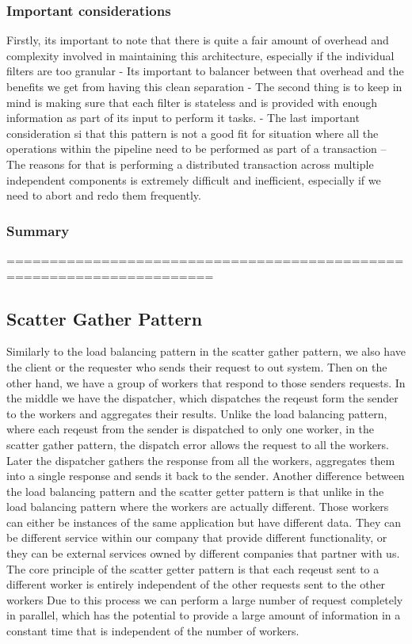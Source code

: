 \documentclass[a4paper, 11pt]{book}
\begin{document}
    \subsubsection{Important considerations}
    Firstly, its important to note that there is quite a fair amount of overhead and complexity involved in maintaining this architecture, especially if the individual filters are too granular
    - Its important to balancer between that overhead and the benefits we get from having this clean separation
    - The second thing is to keep in mind is making sure that each filter is stateless and is provided with enough information as part of its input to perform it tasks.
    - The last important consideration si that this pattern is not a good fit for situation where all the operations within the pipeline need to be performed as part of a transaction
    -- The reasons for that is performing a distributed transaction across multiple independent components is extremely difficult and inefficient, especially if we need to abort and redo them frequently.

    \subsubsection{Summary}
    ======================================================================

    \subsection{Scatter Gather Pattern}

    Similarly to the load balancing pattern in the scatter gather pattern, we also have the client or the requester who sends their request to out system.
    Then on the other hand, we have a group of workers that respond to those senders requests.
    In the middle we have the dispatcher, which dispatches the reqeust form the sender to the workers and aggregates their results.
    Unlike the load balancing pattern, where each reqeust from the sender is dispatched to only one worker, in the scatter gather pattern, the dispatch error allows the request to all the workers.
    Later the dispatcher gathers the response from all the workers, aggregates them into a single response and sends it back to the sender.
    Another difference between the load balancing pattern and the scatter getter pattern is that unlike in the load balancing pattern where the workers are actually different.
    Those workers can either be instances of the same application but have different data.
    They can be different service within our company that provide different functionality, or they can be external services owned by different companies that partner with us.
    The core principle of the scatter getter pattern is that each reqeust sent to a different worker is entirely independent of the other requests sent to the other workers
    Due to this process we can perform a large number of request completely in parallel, which has the potential to provide a large amount of information in a constant time that is independent of the number of workers.
\end{document}
